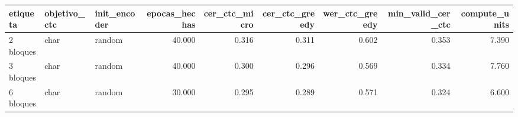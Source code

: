 \begin{tabular}{lllrrrrrr}
\toprule
etiqueta & objetivo_ctc & init_encoder & epocas_hechas & cer_ctc_micro & cer_ctc_greedy & wer_ctc_greedy & min_valid_cer_ctc & compute_units \\
\midrule
2 bloques & char & random & 40.000 & 0.316 & 0.311 & 0.602 & 0.353 & 7.390 \\
3 bloques & char & random & 40.000 & 0.300 & 0.296 & 0.569 & 0.334 & 7.760 \\
6 bloques & char & random & 30.000 & 0.295 & 0.289 & 0.571 & 0.324 & 6.600 \\
\bottomrule
\end{tabular}

